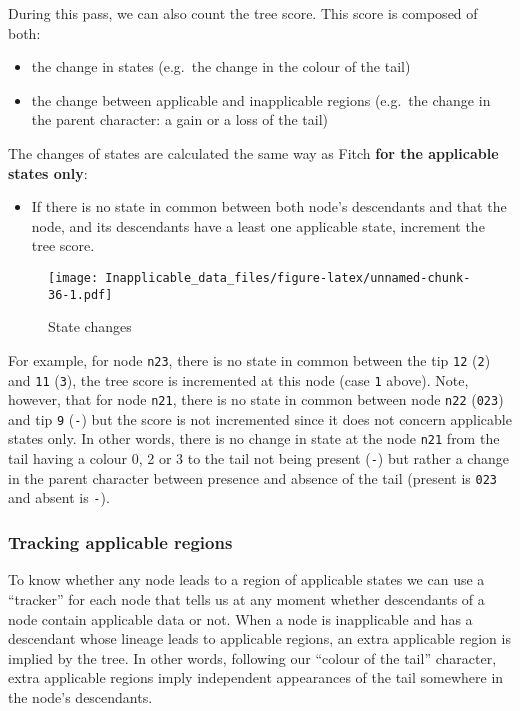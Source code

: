 \documentclass[]{book}
\providecommand{\tightlist}{%
  \setlength{\itemsep}{0pt}\setlength{\parskip}{0pt}}
\theoremstyle{definition}
\theoremstyle{definition}
\theoremstyle{definition}
\theoremstyle{remark}
\begin{document}
During this pass, we can also count the tree score. This score is
composed of both:

\begin{itemize}
\tightlist
\item
  the change in states (e.g.~the change in the colour of the tail)
\item
  the change between applicable and inapplicable regions (e.g.~the
  change in the parent character: a gain or a loss of the tail)
\end{itemize}

The changes of states are calculated the same way as Fitch \textbf{for
the applicable states only}:

\begin{itemize}
\tightlist
\item
  If there is no state in common between both node's descendants and
  that the node, and its descendants have a least one applicable state,
  increment the tree score.
\end{itemize}

\begin{figure}
\centering
\texttt{[image: Inapplicable\_data\_files/figure-latex/unnamed-chunk-36-1.pdf]}
\caption{\label{fig:unnamed-chunk-36}State changes}
\end{figure}

For example, for node \texttt{n23}, there is no state in common between
the tip \texttt{12} (\texttt{2}) and \texttt{11} (\texttt{3}), the tree
score is incremented at this node (case \texttt{1} above). Note,
however, that for node \texttt{n21}, there is no state in common between
node \texttt{n22} (\texttt{023}) and tip \texttt{9} (\texttt{-}) but the
score is not incremented since it does not concern applicable states
only. In other words, there is no change in state at the node
\texttt{n21} from the tail having a colour 0, 2 or 3 to the tail not
being present (\texttt{-}) but rather a change in the parent character
between presence and absence of the tail (present is \texttt{023} and
absent is \texttt{-}).

\subsubsection{Tracking applicable
regions}\label{tracking-applicable-regions}

To know whether any node leads to a region of applicable states we can
use a ``tracker'' for each node that tells us at any moment whether
descendants of a node contain applicable data or not. When a node is
inapplicable and has a descendant whose lineage leads to applicable
regions, an extra applicable region is implied by the tree. In other
words, following our ``colour of the tail'' character, extra applicable
regions imply independent appearances of the tail somewhere in the
node's descendants.
\end{document}
